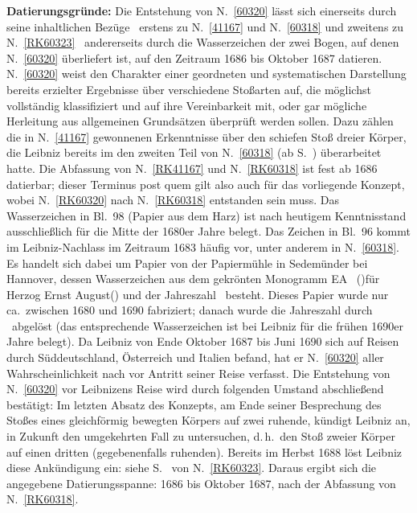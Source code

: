 \begin{ledgroup}
\footnotesize
%
\pstart
\noindent%
\textbf{Datierungsgründe:}
Die Entstehung von N.~\ref{60320} lässt sich einerseits 
durch seine inhaltlichen Bezüge 
\textendash\ erstens zu N.~\ref{41167} und N.~\ref{60318} und zweitens zu N.~\ref{RK60323} \textendash\
andererseits
durch die Wasserzeichen der zwei Bogen, auf denen N.~\ref{60320} überliefert ist, 
auf den Zeitraum 1686 bis Oktober 1687 datieren.
%
N.~\ref{60320} weist den Charakter einer geordneten und systematischen Darstellung bereits erzielter Ergebnisse
%
über verschiedene Stoßarten auf, die möglichst vollständig klassifiziert und
%
auf ihre Vereinbarkeit mit, oder gar mögliche Herleitung aus allgemeinen Grundsätzen überprüft werden sollen.
%
Dazu zählen die in N.~\ref{41167} gewonnenen Erkenntnisse über den schiefen Stoß dreier Körper, die Leibniz bereits im den zweiten Teil 
%
von N.~\ref{60318} (ab S.~) überarbeitet hatte.
%
Die Abfassung von N.~\ref{RK41167} und N.~\ref{RK60318} ist fest ab 1686 datierbar; 
%
dieser Terminus post quem gilt also auch für das vorliegende Konzept, wobei
%
N.~\ref{RK60320} nach N.~\ref{RK60318} entstanden sein muss.
%
\pend
%
\pstart
Das Wasserzeichen in Bl.~98 (Papier aus dem Harz) ist nach heutigem Kenntnisstand ausschließlich für die Mitte der 1680er Jahre belegt.
%
Das Zeichen in Bl.~96 kommt im Leibniz-Nachlass im Zeitraum 1683 häufig vor, unter anderem in N.~\ref{60318}. 
%
Es handelt sich dabei um Papier von der Papiermühle in Sedemünder bei Hannover, 
%
dessen Wasserzeichen aus dem gekrönten Monogramm \glqq EA\grqq\ 
%
(\protect\vphantom)für \protect{}Herzog Ernst August\protect\vphantom()
%
und der Jahreszahl \glqq 1680\grqq\ besteht.
%
Dieses Papier wurde nur ca.\ zwischen 1680 und 1690 fabriziert; danach wurde die Jahreszahl durch \grqq\ abgelöst 
%
(das entsprechende Wasserzeichen ist bei Leibniz für die frühen 1690er Jahre belegt).
%
Da Leibniz von Ende Oktober 1687 bis Juni 1690 sich auf Reisen durch Süddeutschland, Österreich und Italien befand, 
%
hat er N.~\ref{60320} aller Wahrscheinlichkeit nach vor Antritt seiner Reise verfasst.
%
\pend
%
\pstart
Die Entstehung von N.~\ref{60320} vor Leibnizens Reise wird durch folgenden Umstand abschließend bestätigt:
%
Im letzten Absatz des Konzepts, am Ende seiner Besprechung des Stoßes eines gleichförmig bewegten Körpers auf zwei ruhende,
%
kündigt Leibniz an, in Zukunft den umgekehrten Fall zu untersuchen, d.\,h.\ den Stoß zweier Körper auf einen dritten (gegebenenfalls ruhenden).
%
Bereits im Herbst 1688 löst Leibniz diese Ankündigung ein: siehe 
%
S.~ von N.~\ref{RK60323}.
%
Daraus ergibt sich die angegebene Datierungsspanne: 1686 bis Oktober 1687, nach der Abfassung von N.~\ref{RK60318}.
\pend
\end{ledgroup}

